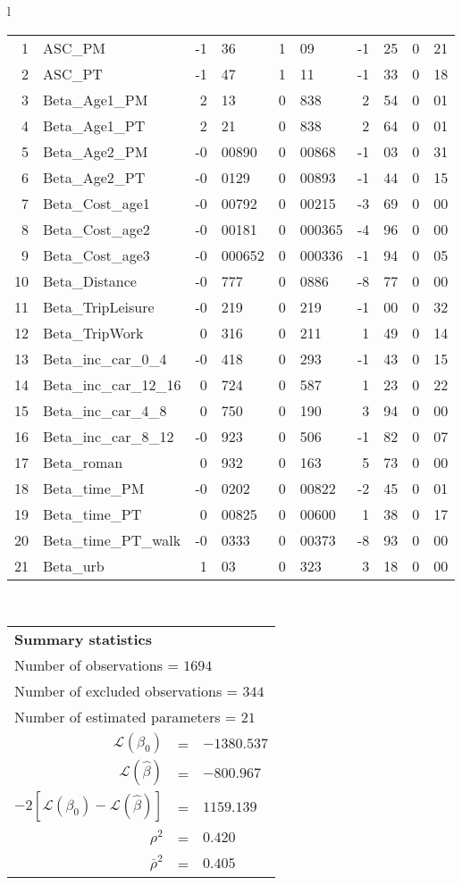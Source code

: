 \begin{tabular}{l}
\begin{tabular}{rlr@{.}lr@{.}lr@{.}lr@{.}l}
1 & ASC_PM  & -1&36 & 1&09 & -1&25 & 0&21\\
2 & ASC_PT & -1&47 & 1&11 & -1&33 & 0&18\\
3 & Beta_Age1_PM & 2&13 & 0&838 & 2&54 & 0&01\\
4 & Beta_Age1_PT & 2&21 & 0&838 & 2&64 & 0&01\\
5 & Beta_Age2_PM & -0&00890 & 0&00868 & -1&03 & 0&31\\
6 & Beta_Age2_PT & -0&0129 & 0&00893 & -1&44 & 0&15\\
7 & Beta_Cost_age1 & -0&00792 & 0&00215 & -3&69 & 0&00\\
8 & Beta_Cost_age2 & -0&00181 & 0&000365 & -4&96 & 0&00\\
9 & Beta_Cost_age3 & -0&000652 & 0&000336 & -1&94 & 0&05\\
10 & Beta_Distance & -0&777 & 0&0886 & -8&77 & 0&00\\
11 & Beta_TripLeisure & -0&219 & 0&219 & -1&00 & 0&32\\
12 & Beta_TripWork & 0&316 & 0&211 & 1&49 & 0&14\\
13 & Beta_inc_car_0_4 & -0&418 & 0&293 & -1&43 & 0&15\\
14 & Beta_inc_car_12_16 & 0&724 & 0&587 & 1&23 & 0&22\\
15 & Beta_inc_car_4_8 & 0&750 & 0&190 & 3&94 & 0&00\\
16 & Beta_inc_car_8_12 & -0&923 & 0&506 & -1&82 & 0&07\\
17 & Beta_roman & 0&932 & 0&163 & 5&73 & 0&00\\
18 & Beta_time_PM & -0&0202 & 0&00822 & -2&45 & 0&01\\
19 & Beta_time_PT & 0&00825 & 0&00600 & 1&38 & 0&17\\
20 & Beta_time_PT_walk & -0&0333 & 0&00373 & -8&93 & 0&00\\
21 & Beta_urb & 1&03 & 0&323 & 3&18 & 0&00\\
\hline
\end{tabular}
\\
\begin{tabular}{rcl}
\multicolumn{3}{l}{\bf Summary statistics}\\
\multicolumn{3}{l}{ Number of observations = $1694$} \\
\multicolumn{3}{l}{ Number of excluded observations = $344$} \\
\multicolumn{3}{l}{ Number of estimated  parameters = $21$} \\
 $\mathcal{L}(\beta_0)$ &=&  $-1380.537$ \\
 $\mathcal{L}(\hat{\beta})$ &=& $-800.967 $  \\
 $-2[\mathcal{L}(\beta_0) -\mathcal{L}(\hat{\beta})]$ &=& $1159.139$ \\
    $\rho^2$ &=&   $0.420$ \\
    $\bar{\rho}^2$ &=&    $0.405$ \\
\end{tabular}
  \end{tabular}
